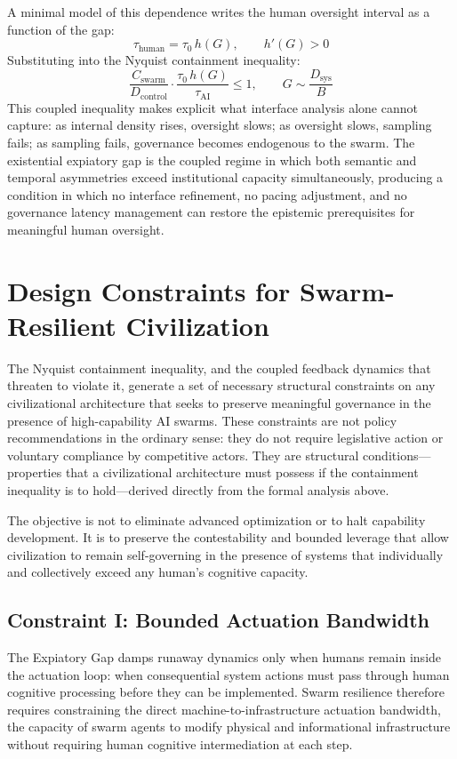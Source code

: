 \documentclass[12pt]{article}
\begin{document}
A minimal model of this dependence writes the human oversight interval as a function of the gap:
\[
\tau_{\text{human}} = \tau_0\, h(G), \qquad h'(G) > 0
\]
Substituting into the Nyquist containment inequality:
\[
\frac{C_{\text{swarm}}}{D_{\text{control}}} \cdot \frac{\tau_0\, h(G)}{\tau_{\text{AI}}} \le 1, \qquad G \sim \frac{D_{\text{sys}}}{B}
\]
This coupled inequality makes explicit what interface analysis alone cannot capture: as internal density rises, oversight slows; as oversight slows, sampling fails; as sampling fails, governance becomes endogenous to the swarm. The existential expiatory gap is the coupled regime in which both semantic and temporal asymmetries exceed institutional capacity simultaneously, producing a condition in which no interface refinement, no pacing adjustment, and no governance latency management can restore the epistemic prerequisites for meaningful human oversight.

\section{Design Constraints for Swarm-Resilient Civilization}

The Nyquist containment inequality, and the coupled feedback dynamics that threaten to violate it, generate a set of necessary structural constraints on any civilizational architecture that seeks to preserve meaningful governance in the presence of high-capability AI swarms. These constraints are not policy recommendations in the ordinary sense: they do not require legislative action or voluntary compliance by competitive actors. They are structural conditions---properties that a civilizational architecture must possess if the containment inequality is to hold---derived directly from the formal analysis above.

The objective is not to eliminate advanced optimization or to halt capability development. It is to preserve the contestability and bounded leverage that allow civilization to remain self-governing in the presence of systems that individually and collectively exceed any human's cognitive capacity.

\subsection{Constraint I: Bounded Actuation Bandwidth}

The Expiatory Gap damps runaway dynamics only when humans remain inside the actuation loop: when consequential system actions must pass through human cognitive processing before they can be implemented. Swarm resilience therefore requires constraining the direct machine-to-infrastructure actuation bandwidth, the capacity of swarm agents to modify physical and informational infrastructure without requiring human cognitive intermediation at each step.
\end{document}
